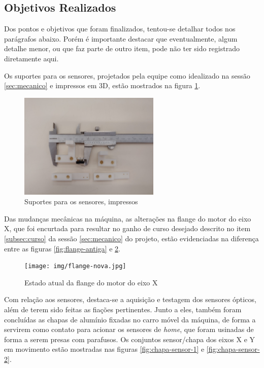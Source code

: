 \documentclass[
	article,			%
	11pt,				%
	oneside,			%
	a4paper,			%
	section=TITLE,		%
	english,			%
	brazil,				%
	sumario=tradicional
	]{abntex2}
\begin{document}
\subsection{Objetivos Realizados}

Dos pontos e objetivos que foram finalizados, tentou-se detalhar todos nos parágrafos abaixo. Porém é importante destacar que eventualmente, algum detalhe menor, ou que faz parte de outro item, pode não ter sido registrado diretamente aqui.

Os suportes para os sensores, projetados pela equipe como idealizado na sessão \ref{sec:mecanico} e impressos em 3D, estão mostrados na figura \ref{fig:suportes-sensores}.

\begin{figure}[H]
    \centering
    \includegraphics[width=0.6\textwidth]{img/suportes-sensores.jpg}
    \caption{Suportes para os sensores, impressos}
    \label{fig:suportes-sensores}
\end{figure}

Das mudanças mecânicas na máquina, as alterações na flange do motor do eixo X, que foi encurtada para resultar no ganho de curso desejado descrito no item \ref{subsec:curso} da sessão \ref{sec:mecanico} do projeto, estão evidenciadas na diferença entre as figuras \ref{fig:flange-antiga} e \ref{fig:flange-2}.

\begin{figure}[H]
    \centering
    \texttt{[image: img/flange-nova.jpg]}
    \caption{Estado atual da flange do motor do eixo X}
    \label{fig:flange-2}
\end{figure}

Com relação aos sensores, destaca-se a aquisição e testagem dos sensores ópticos, além de terem sido feitas as fiações pertinentes. Junto a eles, também foram concluídas as chapas de alumínio fixadas no carro móvel da máquina, de forma a servirem como contato para acionar os sensores de \textit{home}, que foram usinadas de forma a serem presas com parafusos. Os conjuntos sensor/chapa dos eixos X e Y em movimento estão mostradas nas figuras \ref{fig:chapa-sensor-1} e \ref{fig:chapa-sensor-2}.
\end{document}
